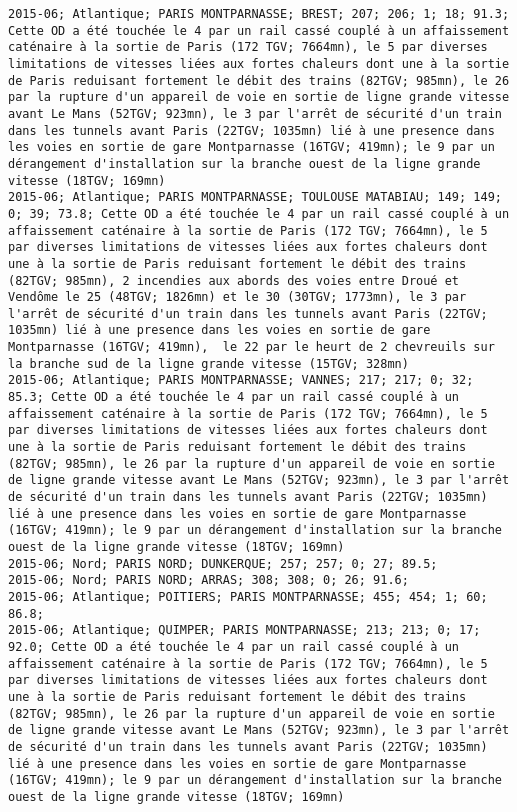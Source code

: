 \documentclass{article}
\begin{document}
\begin{Verbatim}[commandchars=\\\{\}]
2015-06; Atlantique; PARIS MONTPARNASSE; BREST; 207; 206; 1; 18; 91.3; Cette OD a été touchée le 4 par un rail cassé couplé à un affaissement caténaire à la sortie de Paris (172 TGV; 7664mn), le 5 par diverses limitations de vitesses liées aux fortes chaleurs dont une à la sortie de Paris reduisant fortement le débit des trains (82TGV; 985mn), le 26 par la rupture d'un appareil de voie en sortie de ligne grande vitesse avant Le Mans (52TGV; 923mn), le 3 par l'arrêt de sécurité d'un train dans les tunnels avant Paris (22TGV; 1035mn) lié à une presence dans les voies en sortie de gare Montparnasse (16TGV; 419mn); le 9 par un dérangement d'installation sur la branche ouest de la ligne grande vitesse (18TGV; 169mn)
2015-06; Atlantique; PARIS MONTPARNASSE; TOULOUSE MATABIAU; 149; 149; 0; 39; 73.8; Cette OD a été touchée le 4 par un rail cassé couplé à un affaissement caténaire à la sortie de Paris (172 TGV; 7664mn), le 5 par diverses limitations de vitesses liées aux fortes chaleurs dont une à la sortie de Paris reduisant fortement le débit des trains (82TGV; 985mn), 2 incendies aux abords des voies entre Droué et Vendôme le 25 (48TGV; 1826mn) et le 30 (30TGV; 1773mn), le 3 par l'arrêt de sécurité d'un train dans les tunnels avant Paris (22TGV; 1035mn) lié à une presence dans les voies en sortie de gare Montparnasse (16TGV; 419mn),  le 22 par le heurt de 2 chevreuils sur la branche sud de la ligne grande vitesse (15TGV; 328mn)
2015-06; Atlantique; PARIS MONTPARNASSE; VANNES; 217; 217; 0; 32; 85.3; Cette OD a été touchée le 4 par un rail cassé couplé à un affaissement caténaire à la sortie de Paris (172 TGV; 7664mn), le 5 par diverses limitations de vitesses liées aux fortes chaleurs dont une à la sortie de Paris reduisant fortement le débit des trains (82TGV; 985mn), le 26 par la rupture d'un appareil de voie en sortie de ligne grande vitesse avant Le Mans (52TGV; 923mn), le 3 par l'arrêt de sécurité d'un train dans les tunnels avant Paris (22TGV; 1035mn) lié à une presence dans les voies en sortie de gare Montparnasse (16TGV; 419mn); le 9 par un dérangement d'installation sur la branche ouest de la ligne grande vitesse (18TGV; 169mn)
2015-06; Nord; PARIS NORD; DUNKERQUE; 257; 257; 0; 27; 89.5; 
2015-06; Nord; PARIS NORD; ARRAS; 308; 308; 0; 26; 91.6; 
2015-06; Atlantique; POITIERS; PARIS MONTPARNASSE; 455; 454; 1; 60; 86.8; 
2015-06; Atlantique; QUIMPER; PARIS MONTPARNASSE; 213; 213; 0; 17; 92.0; Cette OD a été touchée le 4 par un rail cassé couplé à un affaissement caténaire à la sortie de Paris (172 TGV; 7664mn), le 5 par diverses limitations de vitesses liées aux fortes chaleurs dont une à la sortie de Paris reduisant fortement le débit des trains (82TGV; 985mn), le 26 par la rupture d'un appareil de voie en sortie de ligne grande vitesse avant Le Mans (52TGV; 923mn), le 3 par l'arrêt de sécurité d'un train dans les tunnels avant Paris (22TGV; 1035mn) lié à une presence dans les voies en sortie de gare Montparnasse (16TGV; 419mn); le 9 par un dérangement d'installation sur la branche ouest de la ligne grande vitesse (18TGV; 169mn)

\end{Verbatim}
\end{document}
